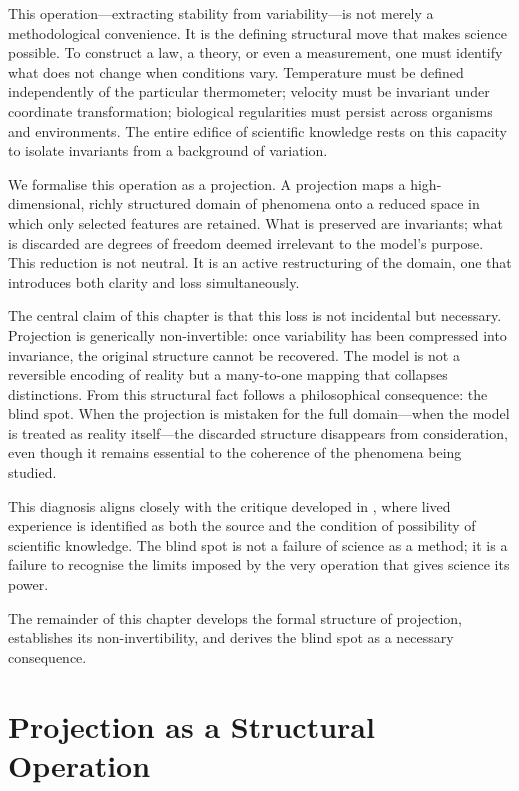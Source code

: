 \documentclass[11pt,openany]{book}
\begin{document}
This operation—extracting stability from variability—is not merely a methodological convenience. It is the defining structural move that makes science possible. To construct a law, a theory, or even a measurement, one must identify what does not change when conditions vary. Temperature must be defined independently of the particular thermometer; velocity must be invariant under coordinate transformation; biological regularities must persist across organisms and environments. The entire edifice of scientific knowledge rests on this capacity to isolate invariants from a background of variation.

We formalise this operation as a projection. A projection maps a high-dimensional, richly structured domain of phenomena onto a reduced space in which only selected features are retained. What is preserved are invariants; what is discarded are degrees of freedom deemed irrelevant to the model’s purpose. This reduction is not neutral. It is an active restructuring of the domain, one that introduces both clarity and loss simultaneously.

The central claim of this chapter is that this loss is not incidental but necessary. Projection is generically non-invertible: once variability has been compressed into invariance, the original structure cannot be recovered. The model is not a reversible encoding of reality but a many-to-one mapping that collapses distinctions. From this structural fact follows a philosophical consequence: the blind spot. When the projection is mistaken for the full domain—when the model is treated as reality itself—the discarded structure disappears from consideration, even though it remains essential to the coherence of the phenomena being studied.

This diagnosis aligns closely with the critique developed in , where lived experience is identified as both the source and the condition of possibility of scientific knowledge. The blind spot is not a failure of science as a method; it is a failure to recognise the limits imposed by the very operation that gives science its power.

The remainder of this chapter develops the formal structure of projection, establishes its non-invertibility, and derives the blind spot as a necessary consequence.

\section{Projection as a Structural Operation}
\label{sec:projection-structure}
\end{document}
